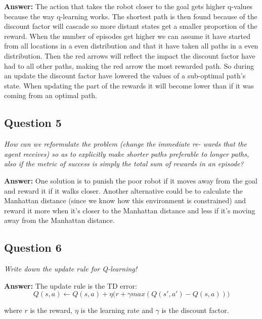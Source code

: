 \documentclass[a4paper]{article}
\begin{document}
\textbf{Answer:} The action that takes the robot closer to the goal gets higher q-values because the way q-learning works. The shortest path is then found because of the discount factor will cascade so more distant states get a smaller proportion of the reward. When the number of episodes get higher we can assume it have started from all locations in a even distribution and that it have taken all paths in a even distribution. Then the red arrows will reflect the impact the discount factor have had to all other paths, making the red arrow the most rewarded path.
So during an update the discount factor have lowered the values of a sub-optimal path's state. When updating the part of the rewards it will become lower than if it was coming from an optimal path. 

\subsection*{Question 5}
\emph{How can we reformulate the problem (change the immediate re-
wards that the agent receives) so as to explicitly make shorter paths preferable to longer paths, also if the metric of success is simply the total sum of rewards in an episode?}

\textbf{Answer:} One solution is to punish the poor robot if it moves away from the goal and reward it if it walks closer. 
Another alternative could be to calculate the Manhattan distance (since we know how this environment is constrained) and reward it more when it's closer to the Manhattan distance and less if it's moving away from the Manhattan distance.

\subsection*{Question 6}
\emph{Write down the update rule for Q-learning!}

\textbf{Answer:} 
The update rule is the TD error:
\begin{equation*}
Q(s, a) \leftarrow Q(s, a) + \eta \bigg( r + \gamma max(Q(s', a') - Q(s, a)) \bigg)
\end{equation*}

 where $r$ is the reward, $\eta$ is the learning rate and $\gamma$ is the discount factor.
\end{document}
